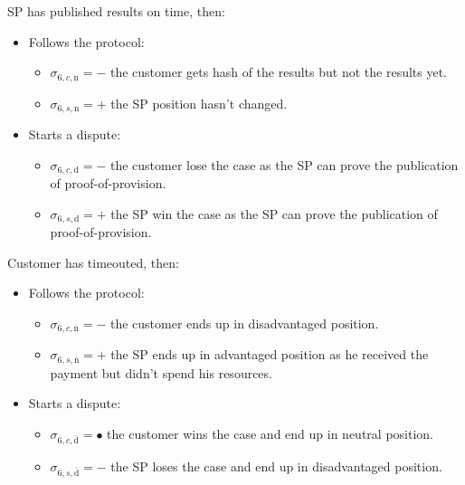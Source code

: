 \documentclass{ieeeaccess}
\begin{document}
SP has published results on time, then:

\begin{itemize}
\item
  Follows the protocol:

  \begin{itemize}
  
  \item
    \(\sigma_{6, c, \mathrm{n}} = -\) the customer gets hash of the
    results but not the results yet.
  \item
    \(\sigma_{6, s, \mathrm{n}} = +\) the SP position hasn't changed.
  \end{itemize}
\item
  Starts a dispute:

  \begin{itemize}
  
  \item
    \(\sigma_{6, c, \mathrm{d}} = -\) the customer lose the case as the
    SP can prove the publication of proof-of-provision.
  \item
    \(\sigma_{6, s, \mathrm{d}} = +\) the SP win the case as the SP can
    prove the publication of proof-of-provision.
  \end{itemize}
\end{itemize}

Customer has timeouted, then:

\begin{itemize}
\item
  Follows the protocol:

  \begin{itemize}
  
  \item
    \(\sigma_{6, c, \overline{\mathrm{n}}} = -\) the customer ends up in
    disadvantaged position.
  \item
    \(\sigma_{6, s, \overline{\mathrm{n}}} = +\) the SP ends up in
    advantaged position as he received the payment but didn't spend his
    resources.
  \end{itemize}
\item
  Starts a dispute:

  \begin{itemize}
  
  \item
    \(\sigma_{6, c, \overline{\mathrm{d}}} = •\) the customer wins the
    case and end up in neutral position.
  \item
    \(\sigma_{6, s, \overline{\mathrm{d}}} = -\) the SP loses the case
    and end up in disadvantaged position.
  \end{itemize}
\end{itemize}
\end{document}
